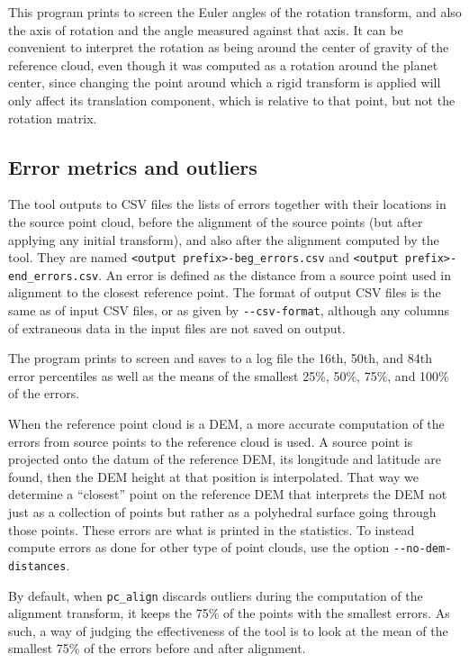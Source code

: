 This program prints to screen the Euler angles of the rotation
transform, and also the axis of rotation and the angle measured against that
axis. It can be convenient to interpret the rotation as being around the
center of gravity of the reference cloud, even though it was computed as
a rotation around the planet center, since changing the point around
which a rigid transform is applied will only affect its translation
component, which is relative to that point, but not the rotation matrix.

\subsection{Error metrics and outliers}

The tool outputs to CSV files the lists of errors together with their
locations in the source point cloud, before the alignment of the source
points (but after applying any initial transform), and also after the alignment
computed by the tool. They are named \texttt{<output prefix>-beg\_errors.csv} and
\texttt{<output prefix>-end\_errors.csv}. An error is defined as the distance from a source
point used in alignment to the closest reference point. The format of
output CSV files is the same as of input CSV files, or as given by
\texttt{-\/-csv-format}, although any columns of extraneous data in the
input files are not saved on output.

The program prints to screen and saves to a log file the 16th, 50th, and
84th error percentiles as well as the means of the smallest 25\%, 50\%,
75\%, and 100\% of the errors.

When the reference point cloud is a DEM, a more accurate computation of
the errors from source points to the reference cloud is used. A source
point is projected onto the datum of the reference DEM, its longitude
and latitude are found, then the DEM height at that position is
interpolated.  That way we determine a ``closest'' point on the
reference DEM that interprets the DEM not just as a collection of points
but rather as a polyhedral surface going through those points. These
errors are what is printed in the statistics. To instead compute
errors as done for other type of point clouds, use the option
\texttt{-\/-no-dem-distances}.

By default, when \texttt{pc\_align} discards outliers during the
computation of the alignment transform, it keeps the 75\% of the points
with the smallest errors. As such, a way of judging the effectiveness of
the tool is to look at the mean of the smallest 75\% of the errors
before and after alignment.

